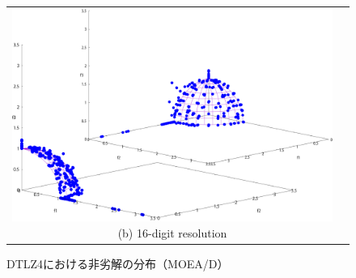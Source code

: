 \documentclass[../main/main]{subfiles}
\begin{document}
\begin{figure}[!htbp]
\begin{tabular}{cc}
\begin{minipage}{0.32\hsize}
\includegraphics[width=1\linewidth]{../figures/MOEAD/DTLZ4_digi16_double.pdf}
\centering
{\footnotesize (b) 16-digit resolution}
\caption{DTLZ4における非劣解の分布（MOEA/D）}
\label{katorisa--n}
\end{minipage}
\end{tabular}
\end{figure}
\end{document}
